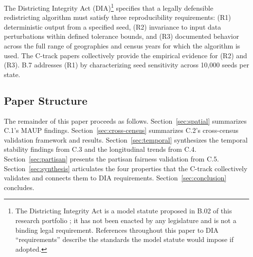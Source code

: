 The Districting Integrity Act (DIA)\footnote{The Districting Integrity
Act is a model statute proposed in B.02 of this research portfolio
\citep{b02paper}; it has not been enacted by any legislature and is not
a binding legal requirement. References throughout this paper to DIA
``requirements'' describe the standards the model statute would impose
if adopted.} specifies that a legally defensible redistricting algorithm
must satisfy three reproducibility requirements: (R1) deterministic output from a
specified seed, (R2) invariance to input data perturbations within
defined tolerance bounds, and (R3) documented behavior across the
full range of geographies and census years for which the algorithm
is used. The C-track papers collectively provide the empirical
evidence for (R2) and (R3). B.7 \citep{b7paper} addresses (R1) by
characterizing seed sensitivity across 10,000 seeds per state.

\subsection{Paper Structure}

The remainder of this paper proceeds as follows.
Section~\ref{sec:spatial} summarizes C.1's MAUP findings.
Section~\ref{sec:cross-census} summarizes C.2's cross-census
validation framework and results.
Section~\ref{sec:temporal} synthesizes the temporal stability
findings from C.3 and the longitudinal trends from C.4.
Section~\ref{sec:partisan} presents the partisan fairness validation
from C.5.
Section~\ref{sec:synthesis} articulates the four properties that the
C-track collectively validates and connects them to DIA requirements.
Section~\ref{sec:conclusion} concludes.
